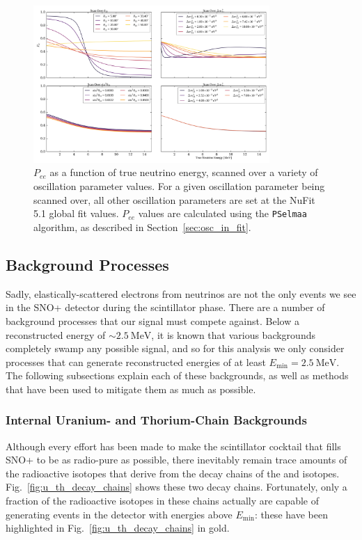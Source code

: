 \begin{figure}
    \centering
    \includegraphics[width=0.8\textwidth]{6_SolarAnalysis/images/pee_scan_plots.pdf}
    \caption[$P_{ee}$ as a function of true neutrino energy, scanned over a variety of oscillation parameter values]
    {$P_{ee}$ as a function of true neutrino energy, scanned over a variety of oscillation parameter values. For a given oscillation parameter being scanned over, all other oscillation parameters are set at the NuFit 5.1 global fit values. $P_{ee}$ values are calculated using the \texttt{PSelmaa} algorithm, as described in Section~\ref{sec:osc_in_fit}.}
    \label{fig:pee_osc_param_dependence}
\end{figure}

\subsection{Background Processes}\label{sec:background_processes}
Sadly, elastically-scattered electrons from \beight{} neutrinos are not the only events we see in the SNO+ detector during the scintillator phase. There are a number of background processes that our signal must compete against. Below a reconstructed energy of $\sim\SI{2.5}{\MeV}$, it is known that various backgrounds completely swamp any possible \beight{} signal, and so for this analysis we only consider processes that can generate reconstructed energies of at least $E_{\textrm{min}} = \SI{2.5}{\MeV}$. The following subsections explain each of these backgrounds, as well as methods that have been used to mitigate them as much as possible.

\subsubsection{Internal Uranium- and Thorium-Chain Backgrounds}\label{sec:u_th_internals}
Although every effort has been made to make the scintillator cocktail that fills SNO+ to be as radio-pure as possible, there inevitably remain trace amounts of the radioactive isotopes that derive from the decay chains of the  and  isotopes. Fig.~\ref{fig:u_th_decay_chains} shows these two decay chains. Fortunately, only a fraction of the radioactive isotopes in these chains actually are capable of generating events in the detector with energies above $E_{\textrm{min}}$: these have been highlighted in Fig.~\ref{fig:u_th_decay_chains} in gold.

